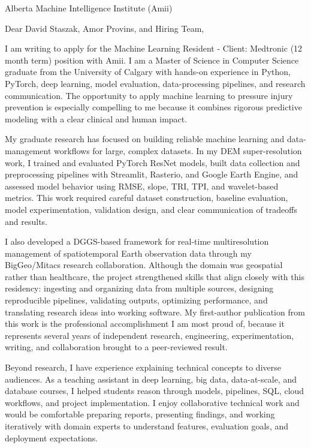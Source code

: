 \documentclass[11pt]{letter}
\begin{document}
\begin{letter}{Alberta Machine Intelligence Institute (Amii)}

\opening{Dear David Staszak, Amor Provins, and Hiring Team,}

I am writing to apply for the Machine Learning Resident - Client: Medtronic (12 month term) position with Amii. I am a Master of Science in Computer Science graduate from the University of Calgary with hands-on experience in Python, PyTorch, deep learning, model evaluation, data-processing pipelines, and research communication. The opportunity to apply machine learning to pressure injury prevention is especially compelling to me because it combines rigorous predictive modeling with a clear clinical and human impact.

My graduate research has focused on building reliable machine learning and data-management workflows for large, complex datasets. In my DEM super-resolution work, I trained and evaluated PyTorch ResNet models, built data collection and preprocessing pipelines with Streamlit, Rasterio, and Google Earth Engine, and assessed model behavior using RMSE, slope, TRI, TPI, and wavelet-based metrics. This work required careful dataset construction, baseline evaluation, model experimentation, validation design, and clear communication of tradeoffs and results.

I also developed a DGGS-based framework for real-time multiresolution management of spatiotemporal Earth observation data through my BigGeo/Mitacs research collaboration. Although the domain was geospatial rather than healthcare, the project strengthened skills that align closely with this residency: ingesting and organizing data from multiple sources, designing reproducible pipelines, validating outputs, optimizing performance, and translating research ideas into working software. My first-author publication from this work is the professional accomplishment I am most proud of, because it represents several years of independent research, engineering, experimentation, writing, and collaboration brought to a peer-reviewed result.

Beyond research, I have experience explaining technical concepts to diverse audiences. As a teaching assistant in deep learning, big data, data-at-scale, and database courses, I helped students reason through models, pipelines, SQL, cloud workflows, and project implementation. I enjoy collaborative technical work and would be comfortable preparing reports, presenting findings, and working iteratively with domain experts to understand features, evaluation goals, and deployment expectations.


\end{letter}
\end{document}
